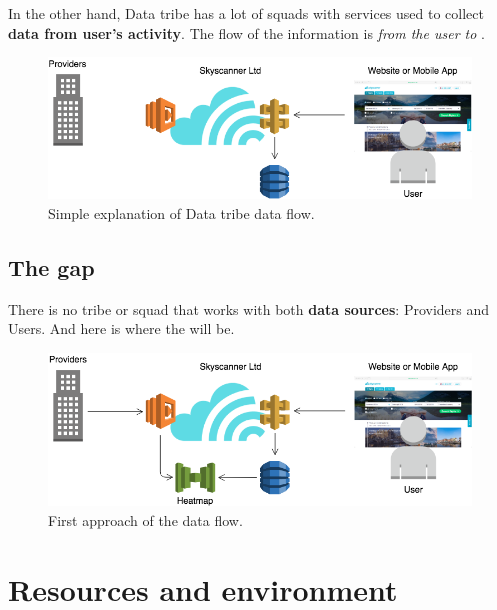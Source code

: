 In the other hand, Data tribe has a lot of squads with services used to collect \textbf{data from user's activity}. The flow of the information is \textit{from the user to \company}.

\begin{figure}[H]
\centering
\includegraphics[scale=0.45]{diagrams/state-of-the-art-tribes-data.png}
\caption{Simple explanation of Data tribe data flow.}
\end{figure}

\subsection{The gap}

There is no tribe or squad that works with both \textbf{data sources}: Providers and Users. And here is where the \textit{\thesistitle} will be.

\begin{figure}[H]
\centering
\includegraphics[scale=0.45]{diagrams/state-of-the-art-tribes-hm.png}
\caption{First approach of the \thesistitle data flow.}
\end{figure}


\section{Resources and environment} \label{res_and_env}

